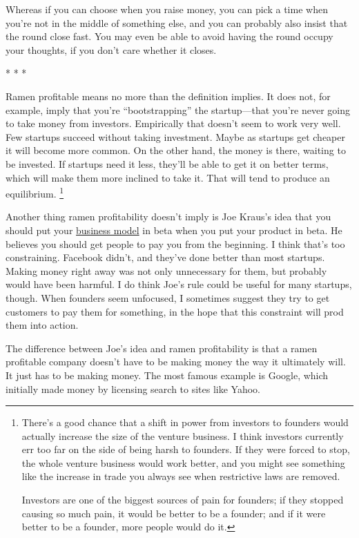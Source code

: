 Whereas if you can choose when you raise money, you can pick a time when
you're not in the middle of something else, and you can probably also
insist that the round close fast. You may even be able to avoid having
the round occupy your thoughts, if you don't care whether it closes.

* * *

Ramen profitable means no more than the definition implies. It does not,
for example, imply that you're ``bootstrapping'' the startup---that
you're never going to take money from investors. Empirically that
doesn't seem to work very well. Few startups succeed without taking
investment. Maybe as startups get cheaper it will become more common. On
the other hand, the money is there, waiting to be invested. If startups
need it less, they'll be able to get it on better terms, which will make
them more inclined to take it. That will tend to produce an equilibrium.
\footnote{There's a good chance that a shift in power from investors to
founders would actually increase the size of the venture business. I
think investors currently err too far on the side of being harsh to
founders. If they were forced to stop, the whole venture business would
work better, and you might see something like the increase in trade you
always see when restrictive laws are removed.

Investors are one of the biggest sources of pain for founders; if they
stopped causing so much pain, it would be better to be a founder; and if
it were better to be a founder, more people would do it.}

Another thing ramen profitability doesn't imply is Joe Kraus's idea that
you should put your
\href{http://www.brendonwilson.com/blog/2006/04/30/joe-kraus-confessions-of-a-startup-addict/}{business
model} in beta when you put your product in beta. He believes you should
get people to pay you from the beginning. I think that's too
constraining. Facebook didn't, and they've done better than most
startups. Making money right away was not only unnecessary for them, but
probably would have been harmful. I do think Joe's rule could be useful
for many startups, though. When founders seem unfocused, I sometimes
suggest they try to get customers to pay them for something, in the hope
that this constraint will prod them into action.

The difference between Joe's idea and ramen profitability is that a
ramen profitable company doesn't have to be making money the way it
ultimately will. It just has to be making money. The most famous example
is Google, which initially made money by licensing search to sites like
Yahoo.


